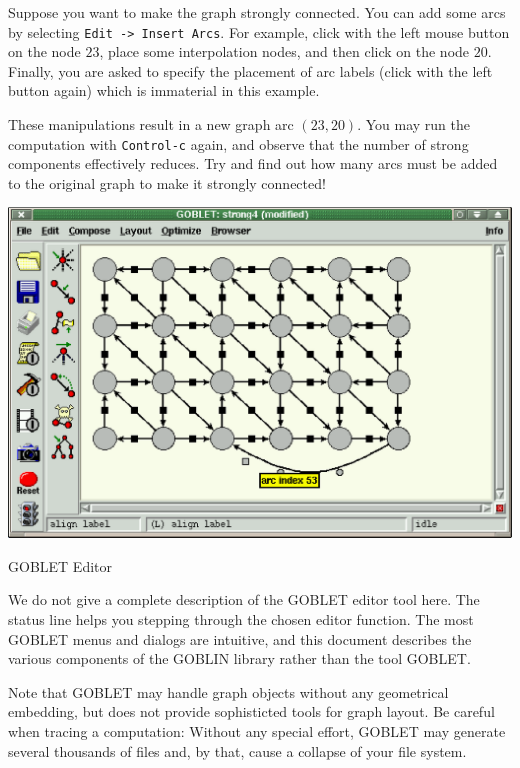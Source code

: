 \documentclass[a4paper,11pt,twoside]{book}
\begin{document}
\begin{multicols}{2}
\noindent
Suppose you want to make the graph strongly connected. You can add some arcs
by selecting \verb/Edit -> Insert Arcs/. For example, click with the left
mouse button on the node $23$, place some interpolation nodes, and then click
on the node $20$. Finally, you are asked to specify the placement of arc
labels (click with the left button again) which is immaterial in this example.

These manipulations result in a new graph arc $(23,20)$. You may run the
computation with \verb/Control-c/ again, and observe that the number of strong
components effectively reduces. Try and find out how many arcs must be added
to the original graph to make it strongly connected!

\bigskip
\begin{figurehere}
\begin{center}
\includegraphics*[scale=0.5]{edit.ps}
\vspace{0.5cm}
\caption{\label{flb_edit}GOBLET Editor}
\end{center}
\end{figurehere}

\noindent
We do not give a complete description of the GOBLET editor tool here.
The status line helps you stepping through the chosen editor function.
The most GOBLET menus and dialogs are intuitive, and this document describes
the various components of the GOBLIN library rather than the tool GOBLET.

Note that GOBLET may handle graph objects without any geometrical embedding,
but does not provide sophisticted tools for graph layout. Be careful when
tracing a computation: Without any special effort, GOBLET may generate several
thousands of files and, by that, cause a collapse of your file system.



\end{multicols}
\end{document}
